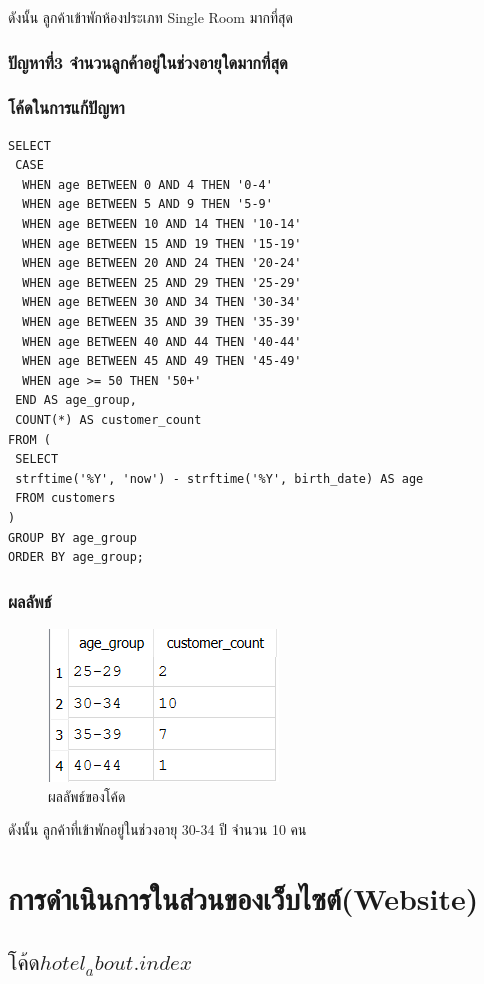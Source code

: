 \documentclass{report}
\begin{document}
ดังนั้น ลูกค้าเข้าพักห้องประเภท Single Room มากที่สุด

\pagebreak

\subsection{ปัญหาที่3 จำนวนลูกค้าอยู่ในช่วงอายุใดมากที่สุด}
\subsection{โค้ดในการแก้ปัญหา}
\begin{verbatim}
SELECT 
 CASE 
  WHEN age BETWEEN 0 AND 4 THEN '0-4'
  WHEN age BETWEEN 5 AND 9 THEN '5-9'
  WHEN age BETWEEN 10 AND 14 THEN '10-14'
  WHEN age BETWEEN 15 AND 19 THEN '15-19'
  WHEN age BETWEEN 20 AND 24 THEN '20-24'
  WHEN age BETWEEN 25 AND 29 THEN '25-29'
  WHEN age BETWEEN 30 AND 34 THEN '30-34'
  WHEN age BETWEEN 35 AND 39 THEN '35-39'
  WHEN age BETWEEN 40 AND 44 THEN '40-44'
  WHEN age BETWEEN 45 AND 49 THEN '45-49'
  WHEN age >= 50 THEN '50+'
 END AS age_group,
 COUNT(*) AS customer_count
FROM (
 SELECT 
 strftime('%Y', 'now') - strftime('%Y', birth_date) AS age
 FROM customers
)
GROUP BY age_group
ORDER BY age_group;

\end{verbatim}

\subsection{ผลลัพธ์}

\begin{figure}[h!]
\centering
\includegraphics[scale=0.75]{age.png}
\caption{ผลลัพธ์ของโค้ด} 
\label{fig:graph15}
\end{figure} 

ดังนั้น ลูกค้าที่เข้าพักอยู่ในช่วงอายุ 30-34 ปี จำนวน 10 คน


\chapter{การดำเนินการในส่วนของเว็บไซต์(Website)}
\section{$โค้ดhotel_about.index$}
\end{document}
